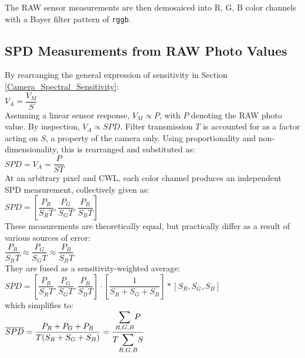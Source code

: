 \documentclass[twocolumn,10pt]{asme2ej}
\begin{document}
 The RAW sensor measurements are then demosaiced into R, G, B color channels with a Bayer filter pattern of \texttt{rggb}.

\subsection{SPD Measurements from RAW Photo Values}

 By rearranging the general expression of sensitivity in Section \ref{Camera_Spectral_Sensitivity}: \\

 $V_A = \dfrac{V_M}{S}$ \\

Assuming a linear sensor response, $V_M \propto P$, with $P$ denoting the RAW photo value. By inspection, $V_A \propto SPD$. Filter transmission $T$ is accounted for as a factor acting on $S$, a property of the camera only. Using proportionality and non-dimensionality, this is rearranged and substituted as: \\

 $SPD = V_A = \dfrac{P}{ST}$ \\

 At an arbitrary pixel and CWL, each color channel produces an independent SPD measurement, collectively given as: \\

 $SPD = \left[ \dfrac{P_R}{S_RT},\dfrac{P_G}{S_GT},\dfrac{P_B}{S_BT} \right] $ \\

These measurements are theoretically equal, but practically differ as a result of various sources of error: \\

$\dfrac{P_R}{S_RT} \approx \dfrac{P_G}{S_GT} \approx \dfrac{P_B}{S_BT}$ \\

They are fused as a sensitivity-weighted average: \\

 $\overline{SPD} = \left[ \dfrac{P_R}{S_RT},\dfrac{P_G}{S_GT},\dfrac{P_B}{S_BT} \right] \cdot \left[ \dfrac{1}{S_R+S_G+S_B}\right] * \left[ S_R, S_G, S_B \right] $ \\

 which simplifies to:\\

 $\overline{SPD} = \dfrac{P_R+P_G+P_B}{T(S_R+S_G+S_B)} =  \dfrac{\mathlarger{\sum_{R,G,B}}P}{T \mathlarger{\sum_{R,G,B}}S}$ \\
\end{document}
